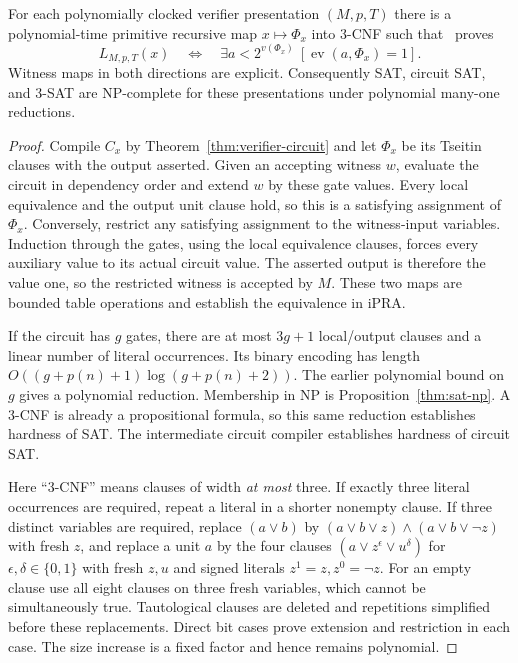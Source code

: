\begin{theorem}
\label{thm:np-complete}
For each polynomially clocked verifier presentation $(M,p,T)$ there is a
polynomial-time primitive recursive map $x\mapsto\Phi_x$ into 3-CNF such
that \ipra\ proves
\[
 L_{M,p,T}(x)
       \quad\Longleftrightarrow\quad
 \exists a<2^{v(\Phi_x)}\ [\operatorname{ev}(a,\Phi_x)=1].
\]
Witness maps in both directions are explicit. Consequently SAT, circuit
SAT, and 3-SAT are NP-complete for these presentations under polynomial
many-one reductions.
\end{theorem}
\begin{proof}
Compile $C_x$ by Theorem~\ref{thm:verifier-circuit} and let $\Phi_x$ be
its Tseitin clauses with the output asserted. Given an accepting witness
$w$, evaluate the circuit in dependency order and extend $w$ by these
gate values. Every local equivalence and the output unit clause hold,
so this is a satisfying assignment of $\Phi_x$. Conversely, restrict any
satisfying assignment to the witness-input variables. Induction through
the gates, using the local equivalence clauses, forces every auxiliary
value to its actual circuit value. The asserted output is therefore the
value one, so the restricted witness is accepted by $M$. These two maps
are bounded table operations and establish the equivalence in iPRA.

If the circuit has $g$ gates, there are at most $3g+1$ local/output
clauses and a linear number of literal occurrences. Its binary encoding
has length $O((g+p(n)+1)\log(g+p(n)+2))$. The earlier polynomial bound
on $g$ gives a polynomial reduction. Membership in NP is
Proposition~\ref{thm:sat-np}. A 3-CNF is already a propositional formula,
so this same reduction establishes hardness of SAT. The intermediate
circuit compiler establishes hardness of circuit SAT.

Here ``3-CNF'' means clauses of width \emph{at most} three. If exactly
three literal occurrences are required, repeat a literal in a shorter
nonempty clause. If three distinct variables are required, replace
$(a\vee b)$ by $(a\vee b\vee z)\wedge(a\vee b\vee\neg z)$ with fresh
$z$, and replace a unit $a$ by the four clauses
$(a\vee z^{\epsilon}\vee u^{\delta})$ for
$\epsilon,\delta\in\{0,1\}$ with fresh $z,u$ and signed literals
$z^1=z,z^0=\neg z$. For an empty clause use all eight clauses on three
fresh variables, which cannot be simultaneously true. Tautological clauses
are deleted and repetitions simplified before these replacements. Direct
bit cases prove extension and restriction in each case. The size increase
is a fixed factor and hence remains polynomial.
\end{proof}

